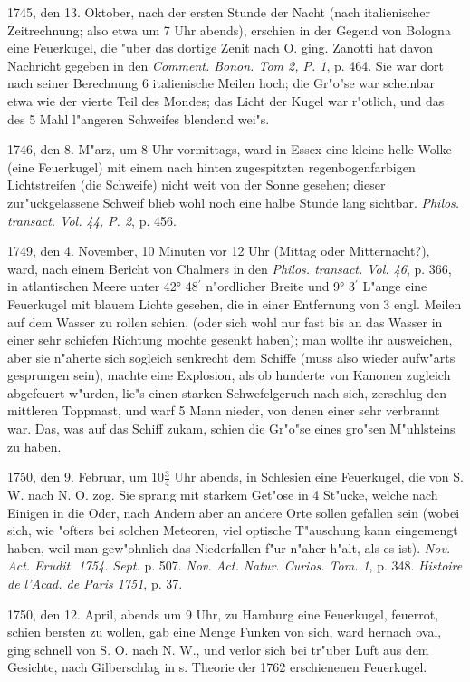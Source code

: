 \documentclass[a4paper, 11pt, oneside, polutonikogreek, german]{article}
\begin{document}
1745, den 13. Oktober, nach der ersten Stunde der Nacht (nach italienischer Zeitrechnung; also etwa um 7 Uhr abends), erschien in der Gegend von Bologna eine Feuerkugel, die "uber das dortige Zenit nach O. ging. Zanotti hat davon Nachricht gegeben in den \emph{Comment. Bonon. Tom 2, P. 1}, p. 464. Sie war dort nach seiner Berechnung 6 italienische Meilen hoch; die Gr"o"se war scheinbar etwa wie der vierte Teil des Mondes; das Licht der Kugel war r"otlich, und das des 5 Mahl l"angeren Schweifes blendend wei"s.

1746, den 8. M"arz, um 8 Uhr vormittags, ward in Essex eine kleine helle Wolke (eine Feuerkugel) mit einem nach hinten zugespitzten regenbogenfarbigen Lichtstreifen (die Schweife) nicht weit von der Sonne gesehen; dieser zur"uckgelassene Schweif blieb wohl noch eine halbe Stunde lang sichtbar. \emph{Philos. transact. Vol. 44, P. 2}, p. 456.

1749, den 4. November, 10 Minuten vor 12 Uhr (Mittag oder Mitternacht?), ward, nach einem Bericht von Chalmers in den \emph{Philos. transact. Vol. 46}, p. 366, in atlantischen Meere unter 42° 48$^{\prime}$ n"ordlicher Breite und 9° 3$^{\prime}$ L"ange eine Feuerkugel mit blauem Lichte gesehen, die in einer Entfernung von 3 engl. Meilen auf dem Wasser zu rollen schien, (oder sich wohl nur fast bis an das Wasser in einer sehr schiefen Richtung mochte gesenkt haben); man wollte ihr ausweichen, aber sie n"aherte sich sogleich senkrecht dem Schiffe (muss also wieder aufw"arts gesprungen sein), machte eine Explosion, als ob hunderte von Kanonen zugleich abgefeuert w"urden, lie"s einen starken Schwefelgeruch nach sich, zerschlug den mittleren Toppmast, und warf 5 Mann nieder, von denen einer sehr verbrannt war. Das, was auf das Schiff zukam, schien die Gr"o"se eines gro"sen M"uhlsteins zu haben.

1750, den 9. Februar, um $\mathfrak{10\frac{3}{4}}$ Uhr abends, in Schlesien eine Feuerkugel, die von S. W. nach N. O. zog. Sie sprang mit starkem Get"ose in 4 St"ucke, welche nach Einigen in die Oder, nach Andern aber an andere Orte sollen gefallen sein (wobei sich, wie "ofters bei solchen Meteoren, viel optische T"auschung kann eingemengt haben, weil man gew"ohnlich das Niederfallen f"ur n"aher h"alt, als es ist). \emph{Nov. Act. Erudit. 1754. Sept.} p. 507. \emph{Nov. Act. Natur. Curios. Tom. 1}, p. 348. \emph{Histoire de l'Acad. de Paris 1751}, p. 37.

1750, den 12. April, abends um 9 Uhr, zu Hamburg eine Feuerkugel, feuerrot, schien bersten zu wollen, gab eine Menge Funken von sich, ward hernach oval, ging schnell von S. O. nach N. W., und verlor sich bei tr"uber Luft aus dem Gesichte, nach Gilberschlag in s. Theorie der 1762 erschienenen Feuerkugel.
\end{document}

